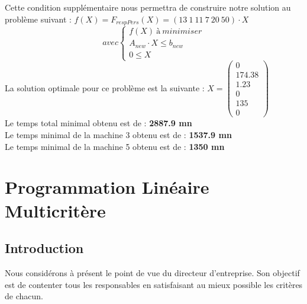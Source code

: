 \documentclass[a4paper, 11pt]{article}
\begin{document}
Cette condition supplémentaire nous permettra de construire notre solution au problème suivant :
$f(X) = F_{respPers} (X) =(13~1~11~7~20~50)\cdot X$ \\
$$
avec \left\{\begin{split}
	f(X)\ à\ minimiser\\
    A_{new}\cdot X \leq b_{new}\\
    0 \leq X
\end{split}\right.
$$
La solution optimale pour ce problème est la suivante :
$ X =\begin{pmatrix}
0\\
174.38\\
1.23\\
0\\
135\\
0
\end{pmatrix} $\\
Le temps total minimal obtenu est de : \textbf{2887.9 mn}\\
Le temps minimal de la machine 3 obtenu est de : \textbf{1537.9 mn}\\
Le temps minimal de la machine 5 obtenu est de : \textbf{1350 mn}

\section{Programmation Linéaire Multicritère}
\subsection{Introduction}
Nous considérons à présent le point de vue du directeur d’entreprise. Son objectif est de contenter tous les responsables en satisfaisant au mieux possible les critères de chacun.
\end{document}
